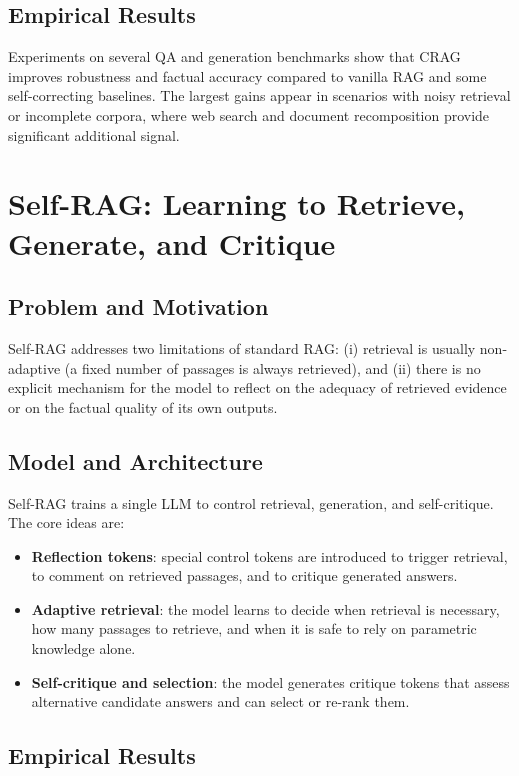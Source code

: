 \documentclass[11pt,a4paper]{article}
\begin{document}
\subsection{Empirical Results}

Experiments on several QA and generation benchmarks show that CRAG improves robustness and factual accuracy compared to vanilla RAG and some self-correcting baselines. The largest gains appear in scenarios with noisy retrieval or incomplete corpora, where web search and document recomposition provide significant additional signal.

\section{Self-RAG: Learning to Retrieve, Generate, and Critique}

\subsection{Problem and Motivation}

Self-RAG addresses two limitations of standard RAG: (i) retrieval is usually non-adaptive (a fixed number of passages is always retrieved), and (ii) there is no explicit mechanism for the model to reflect on the adequacy of retrieved evidence or on the factual quality of its own outputs.

\subsection{Model and Architecture}

Self-RAG trains a single LLM to control retrieval, generation, and self-critique. The core ideas are:
\begin{itemize}[leftmargin=1.2cm]
  \item \textbf{Reflection tokens}: special control tokens are introduced to trigger retrieval, to comment on retrieved passages, and to critique generated answers.
  \item \textbf{Adaptive retrieval}: the model learns to decide when retrieval is necessary, how many passages to retrieve, and when it is safe to rely on parametric knowledge alone.
  \item \textbf{Self-critique and selection}: the model generates critique tokens that assess alternative candidate answers and can select or re-rank them.
\end{itemize}

\subsection{Empirical Results}
\end{document}
